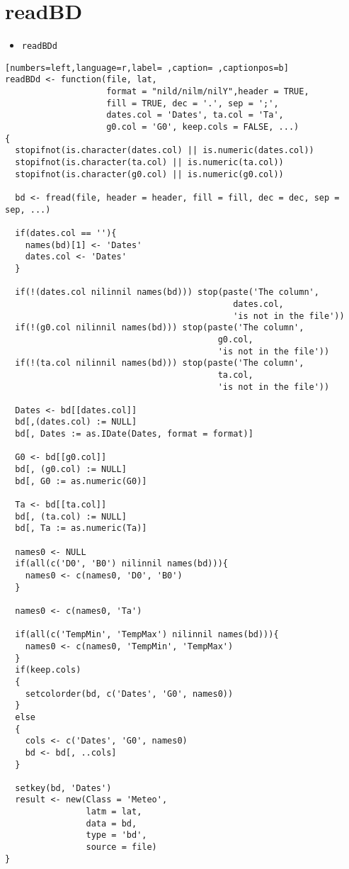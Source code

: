 \section{readBD}
\label{sec:orgd7532b6}
\begin{itemize}
\item \texttt{readBDd}
\end{itemize}
\begin{lstlisting}[numbers=left,language=r,label= ,caption= ,captionpos=b]
readBDd <- function(file, lat,
                    format = "nild/nilm/nilY",header = TRUE,
                    fill = TRUE, dec = '.', sep = ';',
                    dates.col = 'Dates', ta.col = 'Ta',
                    g0.col = 'G0', keep.cols = FALSE, ...)
{
  stopifnot(is.character(dates.col) || is.numeric(dates.col))
  stopifnot(is.character(ta.col) || is.numeric(ta.col))
  stopifnot(is.character(g0.col) || is.numeric(g0.col))

  bd <- fread(file, header = header, fill = fill, dec = dec, sep = sep, ...)

  if(dates.col == ''){
    names(bd)[1] <- 'Dates'
    dates.col <- 'Dates'
  }

  if(!(dates.col nilinnil names(bd))) stop(paste('The column',
                                             dates.col,
                                             'is not in the file'))
  if(!(g0.col nilinnil names(bd))) stop(paste('The column',
                                          g0.col,
                                          'is not in the file'))
  if(!(ta.col nilinnil names(bd))) stop(paste('The column',
                                          ta.col,
                                          'is not in the file'))

  Dates <- bd[[dates.col]]
  bd[,(dates.col) := NULL]
  bd[, Dates := as.IDate(Dates, format = format)]

  G0 <- bd[[g0.col]]
  bd[, (g0.col) := NULL]
  bd[, G0 := as.numeric(G0)]

  Ta <- bd[[ta.col]]
  bd[, (ta.col) := NULL]
  bd[, Ta := as.numeric(Ta)]

  names0 <- NULL
  if(all(c('D0', 'B0') nilinnil names(bd))){
    names0 <- c(names0, 'D0', 'B0')
  }

  names0 <- c(names0, 'Ta')

  if(all(c('TempMin', 'TempMax') nilinnil names(bd))){
    names0 <- c(names0, 'TempMin', 'TempMax')
  }
  if(keep.cols)
  {
    setcolorder(bd, c('Dates', 'G0', names0))
  }
  else
  {
    cols <- c('Dates', 'G0', names0)
    bd <- bd[, ..cols]
  }

  setkey(bd, 'Dates')
  result <- new(Class = 'Meteo',
                latm = lat,
                data = bd,
                type = 'bd',
                source = file)
}
\end{lstlisting}
